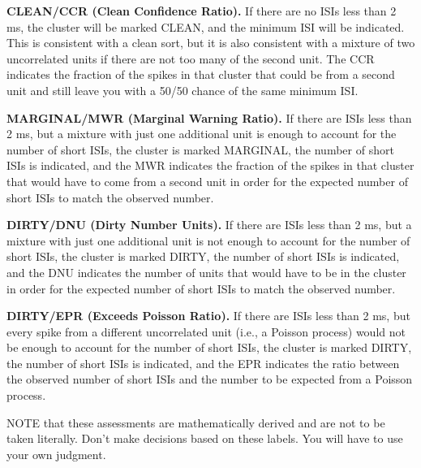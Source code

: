 \documentclass[12pt]{article}
\begin{document}
\begin{description}
\item {\textbf{CLEAN/CCR (Clean Confidence Ratio).}} If there are no
  ISIs less than 2 ms, the cluster will be marked {\sf CLEAN}, and the
  minimum ISI will be indicated. This is consistent with a clean sort,
  but it is also consistent with a mixture of two uncorrelated units
  if there are not too many of the second unit. The CCR indicates the
  fraction of the spikes in that cluster that could be from a second
  unit and still leave you with a 50/50 chance of the same minimum
  ISI.
\item {\textbf{MARGINAL/MWR (Marginal Warning Ratio).}} If there are
  ISIs less than 2 ms, but a mixture with just one additional unit is
  enough to account for the number of short ISIs, the cluster is
  marked {\sf MARGINAL}, the number of short ISIs is indicated, and
  the MWR indicates the fraction of the spikes in that cluster that
  would have to come from a second unit in order for the expected
  number of short ISIs to match the observed number.
\item {\textbf{DIRTY/DNU (Dirty Number Units).}} If there are ISIs
  less than 2 ms, but a mixture with just one additional unit is not
  enough to account for the number of short ISIs, the cluster is
  marked {\sf DIRTY}, the number of short ISIs is indicated, and the
  DNU indicates the number of units that would have to be in the
  cluster in order for the expected number of short ISIs to match the
  observed number.
\item {\textbf{DIRTY/EPR (Exceeds Poisson Ratio).}} If there are ISIs
  less than 2 ms, but every spike from a different uncorrelated unit
  (i.e., a Poisson process) would not be enough to account for the
  number of short ISIs, the cluster is marked {\sf DIRTY}, the number
  of short ISIs is indicated, and the EPR indicates the ratio between
  the observed number of short ISIs and the number to be expected from
  a Poisson process.
\end{description}
NOTE that these assessments are mathematically derived and are not to
be taken literally. Don't make decisions based on these labels. You
will have to use your own judgment.
\end{document}

